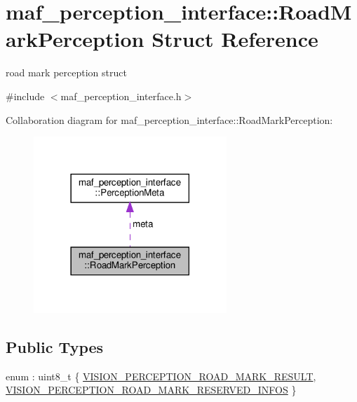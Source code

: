 \hypertarget{structmaf__perception__interface_1_1RoadMarkPerception}{}\section{maf\+\_\+perception\+\_\+interface\+:\+:Road\+Mark\+Perception Struct Reference}
\label{structmaf__perception__interface_1_1RoadMarkPerception}


road mark perception struct  




{\ttfamily \#include $<$maf\+\_\+perception\+\_\+interface.\+h$>$}



Collaboration diagram for maf\+\_\+perception\+\_\+interface\+:\+:Road\+Mark\+Perception\+:\nopagebreak
\begin{figure}[H]
\begin{center}
\leavevmode
\includegraphics[width=206pt]{structmaf__perception__interface_1_1RoadMarkPerception__coll__graph}
\end{center}
\end{figure}
\subsection*{Public Types}
\begin{DoxyCompactItemize}
\item 
enum \+: uint8\+\_\+t \{ \hyperlink{structmaf__perception__interface_1_1RoadMarkPerception_a686a77ce48006ec68f1906cbc49b2e72a6714c2ea739d6e0ec1f915fb73f342f6}{V\+I\+S\+I\+O\+N\+\_\+\+P\+E\+R\+C\+E\+P\+T\+I\+O\+N\+\_\+\+R\+O\+A\+D\+\_\+\+M\+A\+R\+K\+\_\+\+R\+E\+S\+U\+LT}, 
\hyperlink{structmaf__perception__interface_1_1RoadMarkPerception_a686a77ce48006ec68f1906cbc49b2e72aca3a1ac65e4c7da88c5efdabadb752e0}{V\+I\+S\+I\+O\+N\+\_\+\+P\+E\+R\+C\+E\+P\+T\+I\+O\+N\+\_\+\+R\+O\+A\+D\+\_\+\+M\+A\+R\+K\+\_\+\+R\+E\+S\+E\+R\+V\+E\+D\+\_\+\+I\+N\+F\+OS}
 \}
\end{DoxyCompactItemize}

